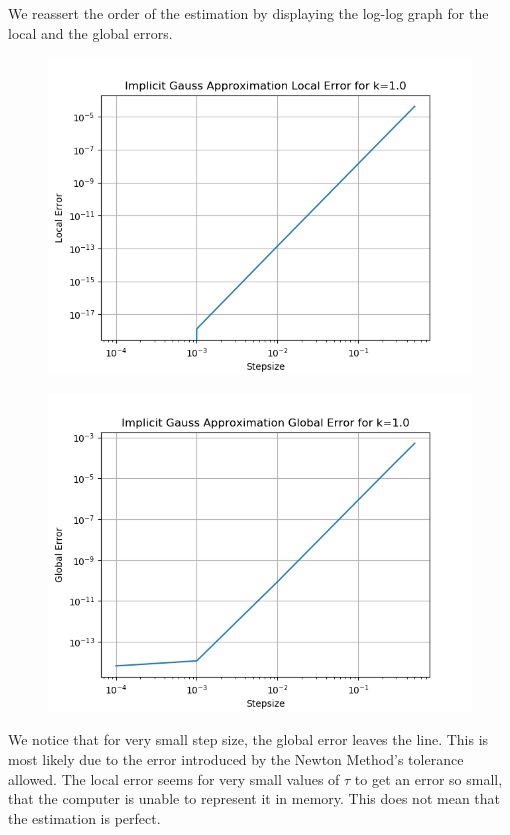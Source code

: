 \documentclass{article}
\theoremstyle{definition}
\begin{document}
\begin{itemize}
		We reassert the order of the estimation by displaying the
		log-log graph for the local and the global errors.
		\begin{figure}[H]
			\includegraphics[scale=0.6]{harmonic_gauss_local_error}
		\end{figure}
		\begin{figure}[H]
			\includegraphics[scale=0.6]{harmonic_gauss_global_error}
		\end{figure}
		We notice that for very small step size, the global error leaves
		the line.  This is most likely due to the error introduced by
		the Newton Method's tolerance allowed.  The local error seems
		for very small values of $\tau$ to get an error so small, that
		the computer is unable to represent it in memory.  This does not
		mean that the estimation is perfect.


\end{itemize}
\end{document}
